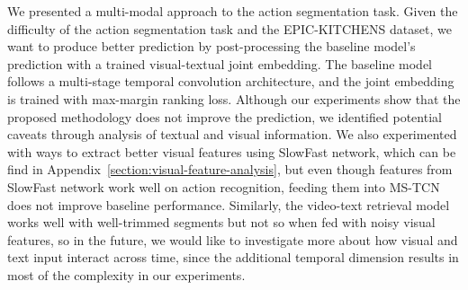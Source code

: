 We presented a multi-modal approach to the action segmentation task. Given the difficulty of the action segmentation task and the EPIC-KITCHENS dataset, we want to produce better prediction by post-processing the baseline model's prediction with a trained visual-textual joint embedding. The baseline model follows a multi-stage temporal convolution architecture, and the joint embedding is trained with max-margin ranking loss. Although our experiments show that the proposed methodology does not improve the prediction, we identified potential caveats through analysis of textual and visual information. We also experimented with ways to extract better visual features using SlowFast network, which can be find in Appendix~\ref{section:visual-feature-analysis}, but even though features from SlowFast network work well on action recognition, feeding them into MS-TCN does not improve baseline performance. Similarly, the video-text retrieval model works well with well-trimmed segments but not so when fed with noisy visual features, so in the future, we would like to investigate more about how visual and text input interact across time, since the additional temporal dimension results in most of the complexity in our experiments.  
